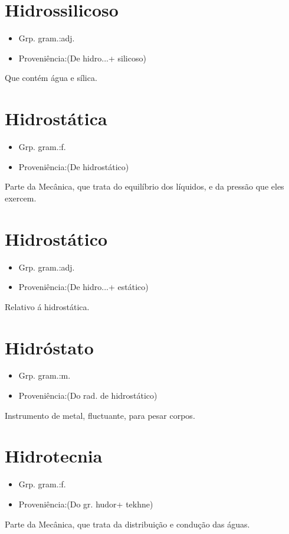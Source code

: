 \documentclass{article}
\begin{document}
\section{Hidrossilicoso}
\begin{itemize}
\item {Grp. gram.:adj.}
\end{itemize}
\begin{itemize}
\item {Proveniência:(De \textunderscore hidro...\textunderscore  + \textunderscore silicoso\textunderscore )}
\end{itemize}
Que contém água e sílica.
\section{Hidrostática}
\begin{itemize}
\item {Grp. gram.:f.}
\end{itemize}
\begin{itemize}
\item {Proveniência:(De \textunderscore hidrostático\textunderscore )}
\end{itemize}
Parte da Mecânica, que trata do equilíbrio dos líquidos, e da pressão que eles exercem.
\section{Hidrostático}
\begin{itemize}
\item {Grp. gram.:adj.}
\end{itemize}
\begin{itemize}
\item {Proveniência:(De \textunderscore hidro...\textunderscore  + \textunderscore estático\textunderscore )}
\end{itemize}
Relativo á hidrostática.
\section{Hidróstato}
\begin{itemize}
\item {Grp. gram.:m.}
\end{itemize}
\begin{itemize}
\item {Proveniência:(Do rad. de \textunderscore hidrostático\textunderscore )}
\end{itemize}
Instrumento de metal, fluctuante, para pesar corpos.
\section{Hidrotecnia}
\begin{itemize}
\item {Grp. gram.:f.}
\end{itemize}
\begin{itemize}
\item {Proveniência:(Do gr. \textunderscore hudor\textunderscore  + \textunderscore tekhne\textunderscore )}
\end{itemize}
Parte da Mecânica, que trata da distribuição e condução das águas.
\end{document}
